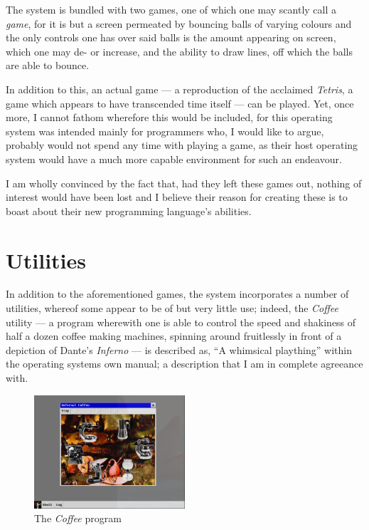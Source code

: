 \documentclass[a5paper,twoside,12pt]{report}
\begin{document}
  The system is bundled with two games, one of which one may scantly call a \textit{game}, for it is but a screen permeated by bouncing balls of varying colours and the only controls one has over said balls is the amount appearing on screen, which one may de- or increase, and the ability to draw lines, off which the balls are able to bounce.


  In addition to this, an actual game — a reproduction of the acclaimed \textit{Tetris}, a game which appears to have transcended time itself — can be played. Yet, once more, I cannot fathom wherefore this would be included, for this operating system was intended mainly for programmers who, I would like to argue, probably would not spend any time with playing a game, as their host operating system would have a much more capable environment for such an endeavour. 

  I am wholly convinced by the fact that, had they left these games out, nothing of interest would have been lost and I believe their reason for creating these is to boast about their new programming language's abilities.

  \section*{Utilities}

  In addition to the aforementioned games, the system incorporates a number of utilities, whereof some appear to be of but very little use; indeed, the \textit{Coffee} utility — a program wherewith one is able to control the speed and shakiness of half a dozen coffee making machines, spinning around fruitlessly in front of a depiction of Dante's \textit{Inferno} — is described as, ``A whimsical plaything'' within the operating systems own manual; a description that I am in complete agreeance with.

  \begin{figure}
    \centering
    \includegraphics[width=0.5\textwidth]{imgs/coffee.png}
    \caption{The \textit{Coffee} program}
  \end{figure}
\end{document}
